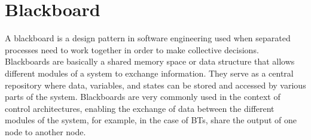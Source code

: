 \section{Blackboard}

A blackboard \cite{BlackboardDesignPattern} is a design pattern in software engineering used when separated processes need to work together in order to make collective decisions. Blackboards are basically a shared memory space or data structure that allows different modules of a system to exchange information. They serve as a central repository where data, variables, and states can be stored and accessed by various parts of the system. Blackboards are very commonly used in the context of control architectures, enabling the exchange of data between the different modules of the system, for example, in the case of BTs, share the output of one node to another node.
